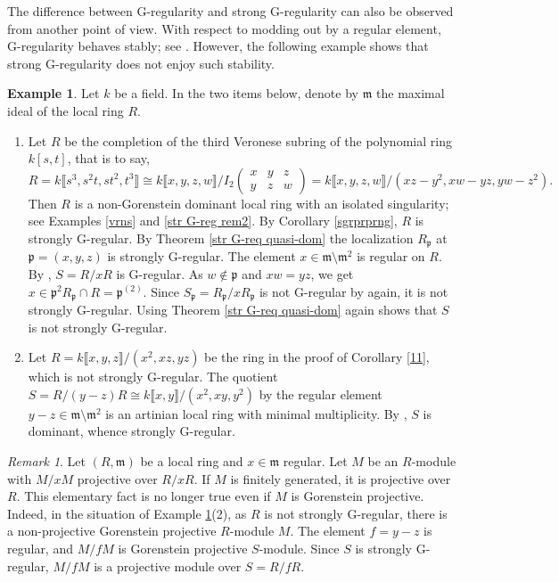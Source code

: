 \documentclass{amsart}
\theoremstyle{definition}
\newtheorem{eg}[thm]{Example}
\theoremstyle{remark}
\newtheorem{rem}[thm]{Remark}
\numberwithin{equation}{thm}
\def\m{\mathfrak{m}}
\def\p{\mathfrak{p}}
\begin{document}
The difference between G-regularity and strong G-regularity can also be observed from another point of view.
With respect to modding out by a regular element, G-regularity behaves stably; see \cite[Propositions 4.2 and 4.6]{T08}. However, the following example shows that strong G-regularity does not enjoy such stability.

\begin{eg}\label{not deform sgr} Let $k$ be a field.
In the two items below, denote by $\m$ the maximal ideal of the local ring $R$.
\begin{enumerate}[(1)]
\item
Let $R$ be the completion of the third Veronese subring of the polynomial ring $k[s,t]$, that is to say, 
$$
R=k\llbracket s^3, s^2t, st^2, t^3\rrbracket\cong k\llbracket x,y,z,w\rrbracket/I_2\left(\begin{smallmatrix}
   x & y & z\\
   y & z & w
\end{smallmatrix}\right)
= k\llbracket x,y,z,w\rrbracket/(xz-y^2, xw-yz, yw-z^2).
$$
Then $R$ is a non-Gorenstein dominant local ring with an isolated singularity; see Examples \ref{vrns} and \ref{str G-reg rem2}.
By Corollary \ref{sgrprprng}, $R$ is strongly G-regular.
By Theorem \ref{str G-req quasi-dom} the localization $R_\p$ at $\p=(x,y,z)$ is strongly G-regular.
The element $x\in\m\setminus\m^2$ is regular on $R$.
By \cite[Proposition 4.6]{T08}, $S=R/xR$ is G-regular.
As $w\notin \p$ and $xw=yz$, we get $x\in \p^2 R_\p\cap R=\p^{(2)}$.
Since $S_\p=R_\p/xR_\p$ is not G-regular by \cite[Proposition 4.6]{T08} again, it is not strongly G-regular.
Using Theorem \ref{str G-req quasi-dom} again shows that $S$ is not strongly G-regular.
\item
Let $R=k\llbracket x,y,z\rrbracket/(x^2, xz, yz)$ be the ring in the proof of Corollary \ref{11}, which is not strongly G-regular.
The quotient $S=R/(y-z)R\cong k\llbracket x,y\rrbracket/(x^2, xy, y^2)$ by the regular element $y-z\in\m\setminus\m^2$ is an artinian local ring with minimal multiplicity.
By \cite[Proposition 5.10]{T23}, $S$ is dominant, whence strongly G-regular. 
\end{enumerate}
\end{eg}

\begin{rem}
Let $(R,\m)$ be a local ring and $x\in\m$ regular.
Let $M$ be an $R$-module with $M/xM$ projective over $R/xR$.
If $M$ is finitely generated, it is projective over $R$.
This elementary fact is no longer true even if $M$ is Gorenstein projective.
Indeed, in the situation of Example \ref{not deform sgr}(2), as $R$ is not strongly G-regular, there is a non-projective Gorenstein projective $R$-module $M$.
The element $f=y-z$ is regular, and $M/fM$ is Gorenstein projective $S$-module.
Since $S$ is strongly G-regular, $M/fM$ is a projective module over $S=R/fR$.
\end{rem}
\end{document}
